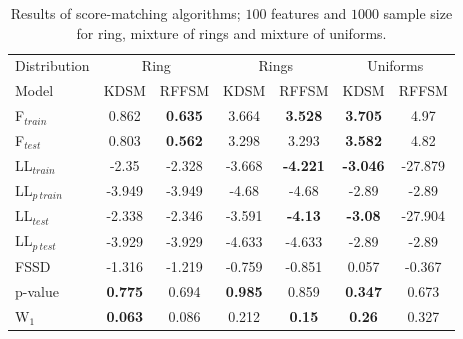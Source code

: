 \begin{table}[H]
    \centering
    \caption{Results of score-matching algorithms; $100$ features and $1000$ sample size for ring, mixture of rings and mixture of uniforms.}
    \label{tab:2d_1000_100_1}
    \begin{tabular}{lcccccc}
     \toprule
     Distribution & \multicolumn{2}{c}{Ring} & \multicolumn{2}{c}{Rings} & \multicolumn{2}{c}{Uniforms}\\
     Model &  KDSM &  RFFSM &  KDSM &  RFFSM &  KDSM &  RFFSM \\
     \midrule
     F$_{train}$ &           0.862 &      \textbf{0.635} &           3.664 &      \textbf{3.528} &           \textbf{3.705} &       4.97 \\
    F$_{test}$  &           0.803 &     \textbf{ 0.562} &           3.298 &      3.293 &           \textbf{3.582} &       4.82 \\
    LL$_{train}$         &           -2.35 &     -2.328 &          -3.668 &     \textbf{-4.221} &          \textbf{-3.046} &    -27.879 \\
    LL$_{p~train}$    &          -3.949 &     -3.949 &           -4.68 &      -4.68 &           -2.89 &      -2.89 \\
    LL$_{test}$          &          -2.338 &     -2.346 &          -3.591 &      \textbf{-4.13} &           \textbf{-3.08} &    -27.904 \\
    LL$_{p~test}$     &          -3.929 &     -3.929 &          -4.633 &     -4.633 &           -2.89 &      -2.89 \\
    FSSD             &          -1.316 &     -1.219 &          -0.759 &     -0.851 &           0.057 &     -0.367 \\
    p-value          &           \textbf{0.775} &      0.694 &           \textbf{0.985} &      0.859 &           \textbf{0.347} &      0.673 \\
    W$_1$               &       \textbf{0.063} &  0.086 &        0.212 &   \textbf{0.15} &        \textbf{0.26} &   0.327 \\

     \bottomrule
\end{tabular}
\end{table}



